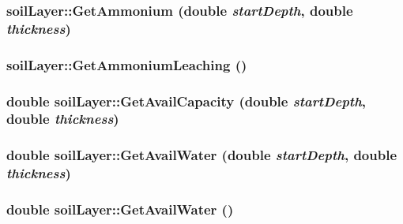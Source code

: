 \label{classsoil_layer_aa5fa8a32edd6f42e0cb5fac607a65b29}
\hypertarget{classsoil_layer_a6c55ade0e8450447467b46f13c169309}{
\subsubsection[{GetAmmonium}]{ soilLayer::GetAmmonium (double {\em startDepth}, \/  double {\em thickness})}}
\label{classsoil_layer_a6c55ade0e8450447467b46f13c169309}
\hypertarget{classsoil_layer_add04d61e6c1bb7294341d18070a0373f}{
\subsubsection[{GetAmmoniumLeaching}]{ soilLayer::GetAmmoniumLeaching ()}}
\label{classsoil_layer_add04d61e6c1bb7294341d18070a0373f}
\hypertarget{classsoil_layer_a08cd2b12daf06c2cd45ef9bad249bdb9}{
\subsubsection[{GetAvailCapacity}]{\setlength{\rightskip}{0pt plus 5cm}double soilLayer::GetAvailCapacity (double {\em startDepth}, \/  double {\em thickness})}}
\label{classsoil_layer_a08cd2b12daf06c2cd45ef9bad249bdb9}
\hypertarget{classsoil_layer_ac5d5fefe115d49e4a6faa7296fa774b6}{
\subsubsection[{GetAvailWater}]{\setlength{\rightskip}{0pt plus 5cm}double soilLayer::GetAvailWater (double {\em startDepth}, \/  double {\em thickness})}}
\label{classsoil_layer_ac5d5fefe115d49e4a6faa7296fa774b6}
\hypertarget{classsoil_layer_aadce28fdd5d1a819981785e6f4954674}{
\subsubsection[{GetAvailWater}]{\setlength{\rightskip}{0pt plus 5cm}double soilLayer::GetAvailWater ()}}
